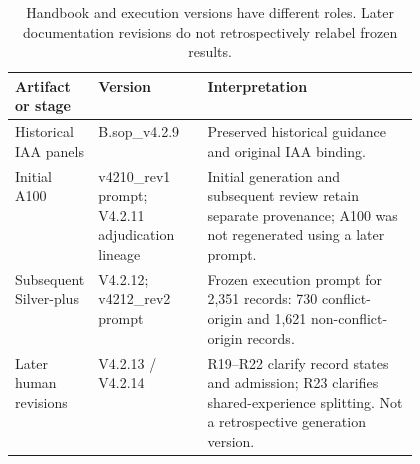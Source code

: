 \begin{table}[!htbp]
\centering
\caption{Handbook and execution versions have different roles. Later documentation revisions do not retrospectively relabel frozen results.}
\label{tab:handbook-versions}
\begin{tabularx}{\linewidth}{@{}P{0.20\linewidth}P{0.27\linewidth}L@{}}
\toprule
Artifact or stage & Version & Interpretation \\
\midrule
Historical IAA panels & B.sop\_v4.2.9 & Preserved historical guidance and original IAA binding. \\
Initial A100 & v4210\_rev1 prompt; V4.2.11 adjudication lineage & Initial generation and subsequent review retain separate provenance; A100 was not regenerated using a later prompt. \\
Subsequent Silver-plus & V4.2.12; v4212\_rev2 prompt & Frozen execution prompt for 2,351 records: 730 conflict-origin and 1,621 non-conflict-origin records. \\
Later human revisions & V4.2.13 / V4.2.14 & R19--R22 clarify record states and admission; R23 clarifies shared-experience splitting. Not a retrospective generation version. \\
\bottomrule
\end{tabularx}
\end{table}
